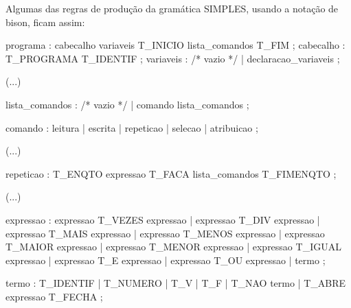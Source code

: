 \documentclass[
  brazilian,
  letterpaper,
]{book}
\newenvironment{Shaded}{\begin{snugshade}}{\end{snugshade}}
\newcommand{\CommentTok}[1]{\textcolor[rgb]{0.37,0.37,0.37}{#1}}
\newcommand{\NormalTok}[1]{\textcolor[rgb]{0.00,0.23,0.31}{#1}}
\newcommand{\OperatorTok}[1]{\textcolor[rgb]{0.37,0.37,0.37}{#1}}
\theoremstyle{plain}
\theoremstyle{definition}
\theoremstyle{remark}
\begin{document}
Algumas das regras de produção da gramática SIMPLES, usando a notação de
bison, ficam assim:

\begin{Shaded}
\begin{Highlighting}[]
\NormalTok{programa}
    \OperatorTok{:}\NormalTok{ cabecalho }
\NormalTok{      variaveis }
\NormalTok{      T\_INICIO lista\_comandos T\_FIM}
    \OperatorTok{;}
\NormalTok{cabecalho}
    \OperatorTok{:}\NormalTok{ T\_PROGRAMA T\_IDENTIF}
    \OperatorTok{;}
\NormalTok{variaveis}
    \OperatorTok{:} \CommentTok{/* vazio */}
    \OperatorTok{|}\NormalTok{ declaracao\_variaveis}
    \OperatorTok{;}

\OperatorTok{(...)}

\NormalTok{lista\_comandos}
    \OperatorTok{:} \CommentTok{/* vazio */}
    \OperatorTok{|}\NormalTok{ comando lista\_comandos}
    \OperatorTok{;}

\NormalTok{comando}
    \OperatorTok{:}\NormalTok{ leitura}
    \OperatorTok{|}\NormalTok{ escrita}
    \OperatorTok{|}\NormalTok{ repeticao}
    \OperatorTok{|}\NormalTok{ selecao}
    \OperatorTok{|}\NormalTok{ atribuicao}
    \OperatorTok{;}

\OperatorTok{(...)}

\NormalTok{repeticao}
    \OperatorTok{:}\NormalTok{ T\_ENQTO expressao T\_FACA }
\NormalTok{      lista\_comandos T\_FIMENQTO}
    \OperatorTok{;}

\OperatorTok{(...)}

\NormalTok{expressao}
    \OperatorTok{:}\NormalTok{ expressao T\_VEZES expressao}
    \OperatorTok{|}\NormalTok{ expressao T\_DIV expressao}
    \OperatorTok{|}\NormalTok{ expressao T\_MAIS expressao}
    \OperatorTok{|}\NormalTok{ expressao T\_MENOS expressao}
    \OperatorTok{|}\NormalTok{ expressao T\_MAIOR expressao}
    \OperatorTok{|}\NormalTok{ expressao T\_MENOR expressao}
    \OperatorTok{|}\NormalTok{ expressao T\_IGUAL expressao}
    \OperatorTok{|}\NormalTok{ expressao T\_E expressao}
    \OperatorTok{|}\NormalTok{ expressao T\_OU expressao}
    \OperatorTok{|}\NormalTok{ termo}
    \OperatorTok{;}

\NormalTok{termo}
    \OperatorTok{:}\NormalTok{ T\_IDENTIF}
    \OperatorTok{|}\NormalTok{ T\_NUMERO}
    \OperatorTok{|}\NormalTok{ T\_V}
    \OperatorTok{|}\NormalTok{ T\_F}
    \OperatorTok{|}\NormalTok{ T\_NAO termo}
    \OperatorTok{|}\NormalTok{ T\_ABRE expressao T\_FECHA}
    \OperatorTok{;} 
\end{Highlighting}
\end{Shaded}
\end{document}
